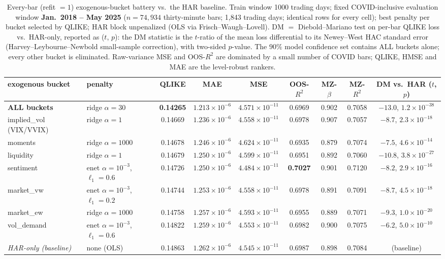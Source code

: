\documentclass[11pt]{article}
\begin{document}
\begin{table}[t]
\centering
\caption{Every-bar (refit $=1$) exogenous-bucket battery vs.\ the HAR baseline. Train window
1000 trading days; fixed COVID-inclusive evaluation window \textbf{Jan.\ 2018 -- May 2025}
($n = 74{,}934$ thirty-minute bars; 1{,}843 trading days; identical rows for every cell); best
penalty per bucket selected by QLIKE; HAR block unpenalized (OLS via Frisch--Waugh--Lovell).
DM $=$ Diebold--Mariano test on per-bar QLIKE loss vs.\ HAR-only, reported as ($t$, $p$): the
DM statistic is the $t$-ratio of the mean loss differential to its Newey--West HAC standard
error (Harvey--Leybourne--Newbold small-sample correction), with two-sided $p$-value.
The $90\%$ model confidence set contains ALL buckets alone;
every other bucket is eliminated. Raw-variance MSE and OOS-$R^2$ are dominated by a small number
of COVID bars; QLIKE, HMSE and MAE are the level-robust rankers.}
\vspace{4pt}
\footnotesize
\setlength{\tabcolsep}{4pt}
\begin{tabular}{@{}llccccccc@{}}
\toprule
exogenous bucket & penalty & QLIKE & MAE & MSE & OOS-$R^2$ & MZ-$\beta$ & MZ-$R^2$ & DM vs.\ HAR ($t$, $p$) \\
\midrule
\textbf{ALL buckets} & ridge $\alpha{=}30$ & \textbf{0.14265} & $1.213 \times 10^{-6}$ & $4.571 \times 10^{-11}$ & 0.6969 & 0.902 & 0.7058 & $-13.0$, $1.2 \times 10^{-38}$ \\
implied\_vol (VIX/VVIX) & ridge $\alpha{=}1$ & 0.14669 & $1.236 \times 10^{-6}$ & $4.558 \times 10^{-11}$ & 0.6978 & 0.907 & 0.7057 & $-8.7$, $2.3 \times 10^{-18}$ \\
moments & ridge $\alpha{=}1000$ & 0.14678 & $1.246 \times 10^{-6}$ & $4.624 \times 10^{-11}$ & 0.6935 & 0.879 & 0.7074 & $-7.5$, $4.6 \times 10^{-14}$ \\
liquidity & ridge $\alpha{=}1$ & 0.14679 & $1.250 \times 10^{-6}$ & $4.599 \times 10^{-11}$ & 0.6951 & 0.892 & 0.7060 & $-10.8$, $3.8 \times 10^{-27}$ \\
sentiment & enet $\alpha{=}10^{-3}$, $\ell_1{=}0.6$ & 0.14726 & $1.250 \times 10^{-6}$ & $4.484 \times 10^{-11}$ & \textbf{0.7027} & 0.901 & 0.7120 & $-8.2$, $2.9 \times 10^{-16}$ \\
market\_vw & enet $\alpha{=}10^{-3}$, $\ell_1{=}0.2$ & 0.14744 & $1.253 \times 10^{-6}$ & $4.558 \times 10^{-11}$ & 0.6978 & 0.891 & 0.7091 & $-8.7$, $4.5 \times 10^{-18}$ \\
market\_ew & ridge $\alpha{=}1000$ & 0.14758 & $1.257 \times 10^{-6}$ & $4.593 \times 10^{-11}$ & 0.6955 & 0.889 & 0.7071 & $-9.3$, $1.0 \times 10^{-20}$ \\
vol\_demand & enet $\alpha{=}10^{-3}$, $\ell_1{=}0.6$ & 0.14822 & $1.259 \times 10^{-6}$ & $4.553 \times 10^{-11}$ & 0.6982 & 0.900 & 0.7075 & $-6.2$, $5.0 \times 10^{-10}$ \\
\emph{HAR-only (baseline)} & none (OLS) & 0.14863 & $1.262 \times 10^{-6}$ & $4.545 \times 10^{-11}$ & 0.6987 & 0.898 & 0.7084 & (baseline) \\
\bottomrule
\end{tabular}
\end{table}
\end{document}

